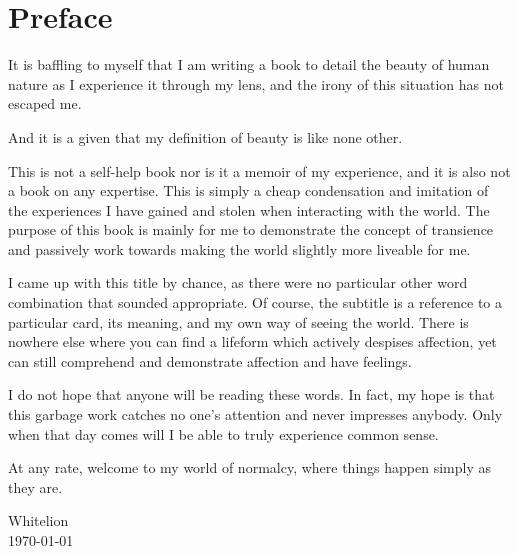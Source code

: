 \chapter{Preface}
\thispagestyle{empty}

It is baffling to myself that I am writing a book to detail the beauty of human nature as I experience it through my lens, and the irony of this situation has not escaped me.

\bigskip
And it is a given that my definition of beauty is like none other.

\bigskip
This is not a self-help book nor is it a memoir of my experience, and it is also not a book on any expertise. This is simply a cheap condensation and imitation of the experiences I have gained and stolen when interacting with the world. The purpose of this book is mainly for me to demonstrate the concept of transience and passively work towards making the world slightly more liveable for me.

\bigskip
I came up with this title by chance, as there were no particular other word combination that sounded appropriate. Of course, the subtitle is a reference to a particular card, its meaning, and my own way of seeing the world. There is nowhere else where you can find a lifeform which actively despises affection, yet can still comprehend and demonstrate affection and have feelings.

\bigskip
I do not hope that anyone will be reading these words. In fact, my hope is that this garbage work catches no one's attention and never impresses anybody. Only when that day comes will I be able to truly experience common sense.

\bigskip
At any rate, welcome to my world of normalcy, where things happen simply as they are.

\vfill
\begin{flushright}
Whitelion\\
\today
\end{flushright} 